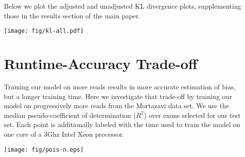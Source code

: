 \documentclass[letterpaper]{article}
\begin{document}
Below we plot the adjusted and unadjusted KL divergence plots, supplementing
those in the results section of the main paper.


\texttt{[image: fig/kl-all.pdf]}


\section{Runtime-Accuracy Trade-off}

Training our model on more reads results in more accurate estimation of bias,
but a longer training time. Here we investigate that trade-off by training our
model on progressively more reads from the Mortazavi data set. We use the
median pseudo-coefficient of determination ($R^2$) over exons selected for our
test set. Each point is additionally labeled with the time used to train the
model on one core of a 3Ghz Intel Xeon processor.

\texttt{[image: fig/pois-n.eps]}




\end{document}
